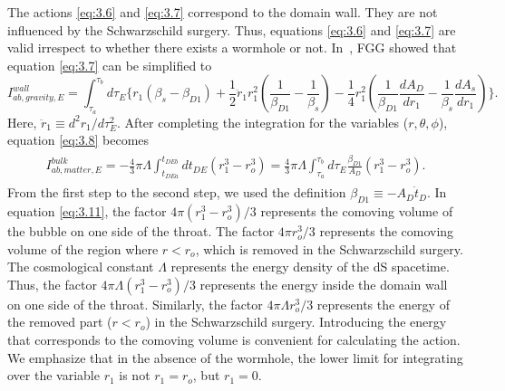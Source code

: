 \documentclass[12pt]{article}
\begin{document}
The actions \eqref{eq:3.6} and \eqref{eq:3.7} correspond to the domain wall. They are not influenced by the Schwarzschild surgery. Thus, equations \eqref{eq:3.6} and \eqref{eq:3.7} are valid irrespect to whether there exists a wormhole or not.  In~\cite{EAJ}, FGG showed that equation \eqref{eq:3.7} can be simplified to
\begin{equation}
\label{eq:3.10}%
I^{wall}_{ab,gravity,E}=\int_{\tau_{a}}^{\tau_{b}}d\tau_{E}\big\{r_{1}(\beta_{s}-\beta_{D1})+\frac{1}{2}\ddot{r}_{1}r_{1}^{2}(\frac{1}{\beta_{D1}}-\frac{1}{\beta_{s}})-
\frac{1}{4}r_{1}^{2}(\frac{1}{\beta_{D1}}\frac{dA_{D}}{dr_{1}}-\frac{1}{\beta_{s}}\frac{dA_{s}}{dr_{1}})\big\}.
\end{equation}
Here, $\ddot{r}_{1}\equiv d^{2}r_{1}/d\tau_{E}^{2}$. After completing the integration for the variables ($r, \theta, \phi$), equation \eqref{eq:3.8} becomes
\begin{eqnarray}\begin{split}
\label{eq:3.11}%
I^{bulk}_{ab,matter,E}=-\frac{4}{3}\pi\Lambda\int_{t_{DEa}}^{t_{DEb}}dt_{DE}(r_{1}^{3}-r_{o}^{3})=\frac{4}{3}\pi\Lambda\int_{\tau_{a}}^{\tau_{b}}d\tau_{E}\frac{\beta_{D1}}{A_{D}}(r_{1}^{3}-r_{o}^{3}).
\end{split}
\end{eqnarray}
From the first step to the second step, we used the definition $\beta_{D1}\equiv-A_{D}\dot{t}_{D}$. In equation \eqref{eq:3.11}, the factor $4\pi(r_{1}^{3}-r_{o}^{3})/3$ represents the comoving volume of the bubble on one side of the throat. The factor $4\pi r_{o}^{3}/3$ represents the comoving volume of the region where $r<r_{o}$, which is removed in the Schwarzschild surgery.  The cosmological constant $\Lambda$ represents the energy density of the dS spacetime. Thus, the factor $4\pi\Lambda(r_{1}^{3}-r_{o}^{3})/3$ represents the energy inside the domain wall on one side of the throat. Similarly, the factor $4\pi\Lambda r_{o}^{3}/3$ represents the energy of the removed part ($r<r_{o}$) in the Schwarzschild surgery. Introducing the energy that corresponds to the comoving volume is convenient for calculating the action.  We emphasize that in the absence of the wormhole, the lower limit for integrating over the variable $r_{1}$ is not  $r_{1}=r_{o}$, but $r_{1}=0$.
\end{document}
